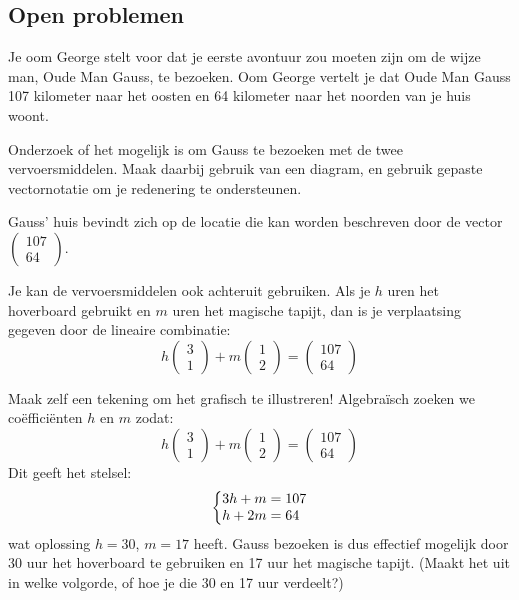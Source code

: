 \documentclass{ximera}
\begin{document}
\subsection*{Open problemen}
\begin{exercise}
Je oom George stelt voor dat je eerste avontuur zou moeten zijn om de wijze man, Oude Man Gauss, te bezoeken.
Oom George vertelt je dat Oude Man Gauss 107 kilometer naar het oosten en 64 kilometer naar het noorden van je huis woont.\newline

Onderzoek of het mogelijk is om Gauss te bezoeken met de twee vervoersmiddelen.
Maak daarbij gebruik van een diagram, en gebruik gepaste vectornotatie om je redenering te ondersteunen.
\begin{hint}
Gauss' huis bevindt zich op de locatie die kan worden beschreven door de vector $\begin{pmatrix} 107 \\ 64 \end{pmatrix}$.
\end{hint}
\begin{hint}
Je kan de vervoersmiddelen ook achteruit gebruiken.
Als je \(h\) uren het hoverboard gebruikt en \(m\) uren het magische tapijt, dan is je verplaatsing gegeven door de lineaire combinatie:
\[h \begin{pmatrix} 3 \\ 1 \end{pmatrix} + m \begin{pmatrix} 1 \\ 2 \end{pmatrix} = \begin{pmatrix} 107 \\ 64 \end{pmatrix}\]
\end{hint}
\begin{oplossing}
Maak zelf een tekening om het grafisch te illustreren!\newline
Algebraïsch zoeken we coëfficiënten \(h\) en \(m\) zodat:
\[h \begin{pmatrix} 3 \\ 1 \end{pmatrix} + m \begin{pmatrix} 1 \\ 2 \end{pmatrix} = \begin{pmatrix} 107 \\ 64 \end{pmatrix}\]
Dit geeft het stelsel:
\[
\left\{
    \begin{array}{@{}l@{}}
    3h+m=107\\
    h+2m=64
    \end{array}
\right.
\]
wat oplossing \(h=30\), \(m=17\) heeft.
Gauss bezoeken is dus effectief mogelijk door 30 uur het hoverboard te gebruiken en 17 uur het magische tapijt.
(Maakt het uit in welke volgorde, of hoe je die 30 en 17 uur verdeelt?)
\end{oplossing}
\end{exercise}
\end{document}
